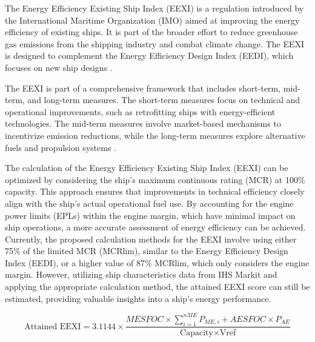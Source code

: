 The Energy Efficiency Existing Ship Index (EEXI) is a regulation introduced by the International Maritime Organization (IMO) aimed at improving the energy efficiency of existing ships.
It is part of the broader effort to reduce greenhouse gas emissions from the shipping industry and combat climate change.
The EEXI is designed to complement the Energy Efficiency Design Index (EEDI), which focuses on new ship designs \autocite{czermanski2022implementation}.

The EEXI is part of a comprehensive framework that includes short-term, mid-term, and long-term measures.
The short-term measures focus on technical and operational improvements, such as retrofitting ships with energy-efficient technologies.
The mid-term measures involve market-based mechanisms to incentivize emission reductions, while the long-term measures explore alternative fuels and propulsion systems \autocite{CHUAH2023115348}.

The calculation of the Energy Efficiency Existing Ship Index (EEXI) can be optimized by considering the ship's maximum continuous rating (MCR) at 100\% capacity.
This approach ensures that improvements in technical efficiency closely align with the ship's actual operational fuel use.
By accounting for the engine power limits (EPLs) within the engine margin, which have minimal impact on ship operations, a more accurate assessment of energy efficiency can be achieved.
Currently, the proposed calculation methods for the EEXI involve using either 75\% of the limited MCR (MCRlim), similar to the Energy Efficiency Design Index (EEDI), or a higher value of 87\% MCRlim, which only considers the engine margin.
However, utilizing ship characteristics data from IHS Markit and applying the appropriate calculation method, the attained EEXI score can still be estimated, providing valuable insights into a ship's energy performance.

\begin{equation}
    \text{Attained EEXI} = 3.1144 \times \frac{MESFOC \times \sum_{i=1}^{nME} P_{ME,i} + AESFOC \times P_{AE}}{\text{Capacity} \times \text{Vref}}
    \label{eq:attained_eexi}
\end{equation}

